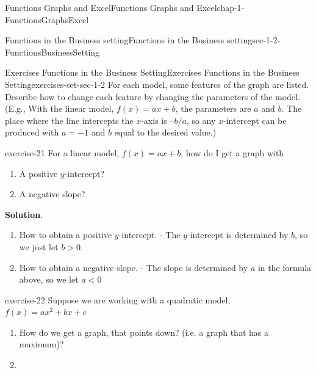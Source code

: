 \documentclass[oneside,10pt,]{book}
\numberwithin{equation}{section}
\newcommand{\lt}{<}
\newcommand{\gt}{>}
\begin{document}
\begin{chapterptx}{Functions Graphs and Excel}{}{Functions Graphs and Excel}{}{}{chap-1-FunctionsGraphsExcel}
\begin{sectionptx}{Functions in the Business setting}{}{Functions in the Business setting}{}{}{sec-1-2-FunctionsBusinessSetting}
\begin{sidebyside}{1}{0.25}{0.25}{0}
\end{sidebyside}%
%
%
\typeout{************************************************}
\typeout{************************************************}
%
\begin{exercises-subsection-numberless}{Exercises  Functions in the Business Setting}{}{Exercises  Functions in the Business Setting}{}{}{exercises-set-sec-1-2}
\hypertarget{p-170}{}%
For each model, some features of the graph are listed.  Describe how to change each feature by changing the parameters of the model.  (E.g., With the linear model, \(f(x)=a x+b\), the parameters are \(a\) and \(b\).  The place where the line intercepts the \(x\)-axis is \(–b/a\), so any \(x\)-intercept can be produced with \(a=-1\) and \(b\) equal to the desired value.)%
\begin{divisionexercise}{1}{}{}{exercise-21}%
\hypertarget{p-171}{}%
For a linear model, \(f(x)=a x+b\), how do I get a graph with\leavevmode%
\begin{enumerate}[label=(\alph*)]
\item\hypertarget{li-68}{}\hypertarget{p-172}{}%
A positive \(y\)-intercept?%
\item\hypertarget{li-69}{}\hypertarget{p-173}{}%
A negative slope?%
\end{enumerate}
%
\par\smallskip%
\noindent\textbf{Solution}.\hypertarget{solution-11}{}\quad%
\leavevmode%
\begin{enumerate}[label=(\alph*)]
\item\hypertarget{li-70}{}\hypertarget{p-174}{}%
How to obtain a positive \(y\)-intercept. - The \(y\)-intercept is determined by \(b\), so we just let \(b\gt 0\).%
\item\hypertarget{li-71}{}\hypertarget{p-175}{}%
How to obtain a negative slope. - The slope is determined by \(a\) in the formula above, so we let \(a\lt 0\)%
\end{enumerate}
\end{divisionexercise}%
\begin{divisionexercise}{2}{}{}{exercise-22}%
\hypertarget{p-176}{}%
Suppose we are working with a quadratic model, \(f(x)=a x^2+b x+c\)\leavevmode%
\begin{enumerate}[label=(\alph*)]
\item\hypertarget{li-72}{}\hypertarget{p-177}{}%
How do we get a graph, that points down? (i.e. a graph that has a maximum)?%
\item\hypertarget{li-73}{}\hypertarget{p-178}{}%

\end{enumerate}
\end{divisionexercise}
\end{exercises-subsection-numberless}
\end{sectionptx}
\end{chapterptx}
\end{document}
